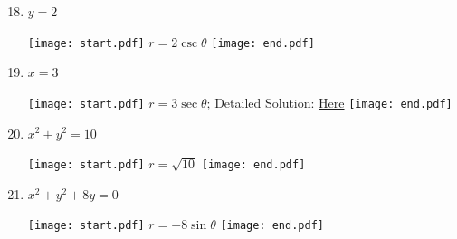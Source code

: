 \documentclass[12pt]{article}
\begin{document}

\begin{enumerate}
\setcounter{enumi}{17}
\item $y=2$ 

\texttt{[image: start.pdf]}
{{$r=2\csc{\theta}$}}
\texttt{[image: end.pdf]}


\item $x=3$ 

\texttt{[image: start.pdf]}
{{$r=3\sec{\theta}$; Detailed Solution: \textcolor{blue}{\href{http://www.math.drexel.edu/classes/Calculus/resources/Math122HW/Solutions/122_18_Polar_19.pdf}{Here}}}}
\texttt{[image: end.pdf]}


\item $x^2+y^2=10$ 

\texttt{[image: start.pdf]}
{{$r=\sqrt{10}$}}
\texttt{[image: end.pdf]}


\item $x^2+y^2+8y=0$

\texttt{[image: start.pdf]}
{{$r=-8\sin{\theta}$}}
\texttt{[image: end.pdf]}


\end{enumerate}

\newpage

\end{document}
